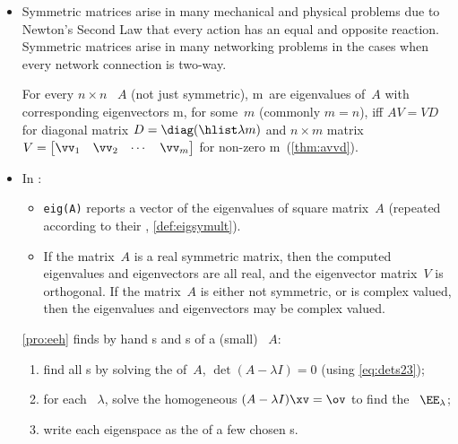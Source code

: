 \begin{itemize}
\item Symmetric matrices arise in many mechanical and physical problems due to Newton's Second Law that every action has an equal and opposite reaction.
Symmetric matrices arise in many networking problems in the cases when every network connection is two-way. 

\itemme For every \(n\times n\) ~\(A\) (not just symmetric),
\hlist\lambda m\ are eigenvalues of~\(A\) with corresponding eigenvectors \hlist\vv m, for some~\(m\) (commonly \(m=n\)), iff \(AV=VD\) for diagonal matrix \(D=\diag(\hlist\lambda m)\) and \(n\times m\) matrix \(V=\begin{bmatrix} \vv_1&\vv_2&\cdots&\vv_m \end{bmatrix}\) for non-zero \hlist\vv m\ (\autoref{thm:avvd}).

\item In \script:
\begin{itemize}
\itemhi {}\verb|[V,D]=eig(A)| computes eigenvectors and the eigenvalues of the  \(n\times n\) ~\(A\).
\begin{itemize}
\item The \(n\)~s of~\(A\) (repeated according to their , \autoref{def:eigsymult}) form the diagonal of \(n\times n\) square matrix \(D=\diag(\hlist\lambda n)\).
\item Corresponding to the \(j\)th~eigenvalue~\(\lambda_j\), the \(j\)th~column of \(n\times n\) square matrix~\(V\) is an  (of unit length).
\end{itemize}
\item \verb|eig(A)| reports a vector of the eigenvalues of square matrix~\(A\) (repeated according to their  , \autoref{def:eigsymult}).

\item If the matrix~\(A\) is a real symmetric matrix, then the computed eigenvalues and eigenvectors are all real, and the eigenvector matrix~\(V\) is orthogonal.
If the matrix~\(A\) is either not symmetric, or is complex valued, then the eigenvalues and eigenvectors may be complex valued.

\end{itemize}


\itemme \autoref{pro:eeh} finds by hand s and s of a (small) ~\(A\):
\begin{enumerate}
\item find all s by solving the  of~\(A\), \(\det(A-\lambda I)=0\) (using \eqref{eq:dets23});
\item for each ~\(\lambda\), solve the homogeneous \((A-\lambda I)\xv=\ov\) to find the ~\(\EE_\lambda\);
\item write each eigenspace as the  of a few chosen s.
\end{enumerate}






\end{itemize}
